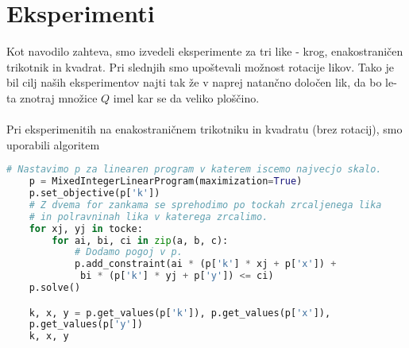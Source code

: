 \documentclass[a4paper, 12pt]{article}
\begin{document}
\section{Eksperimenti}
Kot navodilo zahteva, smo izvedeli eksperimente za tri like - krog, enakostraničen trikotnik in kvadrat. Pri slednjih smo upoštevali možnost rotacije likov.
\newline
Tako je bil cilj naših eksperimentov najti tak že v naprej natančno določen lik, da bo le-ta znotraj množice $Q$ imel kar se da veliko ploščino.
\\~\\
Pri eksperimenitih na enakostraničnem trikotniku in kvadratu (brez rotacij), smo uporabili algoritem 
\begin{lstlisting}[language=Python]
    # Nastavimo p za linearen program v katerem iscemo najvecjo skalo.
    p = MixedIntegerLinearProgram(maximization=True)
    p.set_objective(p['k'])
    # Z dvema for zankama se sprehodimo po tockah zrcaljenega lika
    # in polravninah lika v katerega zrcalimo.
    for xj, yj in tocke:
        for ai, bi, ci in zip(a, b, c):
            # Dodamo pogoj v p.
            p.add_constraint(ai * (p['k'] * xj + p['x']) +
             bi * (p['k'] * yj + p['y']) <= ci)
    p.solve()

    k, x, y = p.get_values(p['k']), p.get_values(p['x']),
    p.get_values(p['y'])
    k, x, y    
\end{lstlisting}
\end{document}
